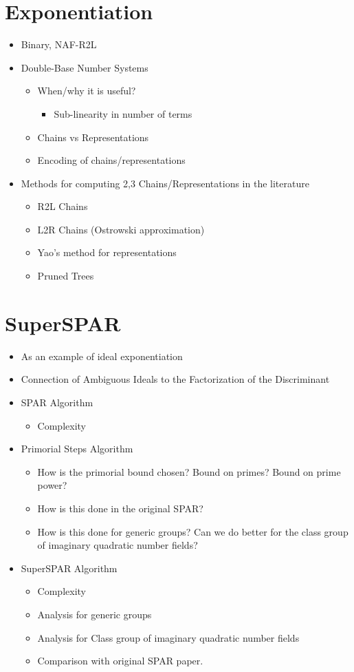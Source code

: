 \documentclass[11pt, letterpaper]{article}
\theoremstyle{definition}
\begin{document}
\section{Exponentiation}
\begin{itemize}
\item Binary, NAF-R2L
\item Double-Base Number Systems
	\begin{itemize}
	\item When/why it is useful?
	\begin{itemize}
		\item Sub-linearity in number of terms
	\end{itemize}
	\item Chains vs Representations
	\item Encoding of chains/representations
	\end{itemize}
\item Methods for computing 2,3 Chains/Representations in the literature
	\begin{itemize}
	\item R2L Chains
	\item L2R Chains (Ostrowski approximation)
	\item Yao's method for representations
	\item Pruned Trees
	\end{itemize}
\end{itemize}


\bigbreak
\section{SuperSPAR}
\begin{itemize}
\item As an example of ideal exponentiation
\item Connection of Ambiguous Ideals to the Factorization of the Discriminant
\item SPAR Algorithm
	\begin{itemize}
		\item Complexity
	\end{itemize}
\item Primorial Steps Algorithm
	\begin{itemize}
	\item How is the primorial bound chosen?  Bound on primes? Bound on prime power?
	\item How is this done in the original SPAR?
	\item How is this done for generic groups?  Can we do better for the class group of imaginary quadratic number fields?
	\end{itemize}
\item SuperSPAR Algorithm
	\begin{itemize}
		\item Complexity
		\item Analysis for generic groups
		\item Analysis for Class group of imaginary quadratic number fields
		\item Comparison with original SPAR paper.
	\end{itemize}
\end{itemize}
\end{document}
